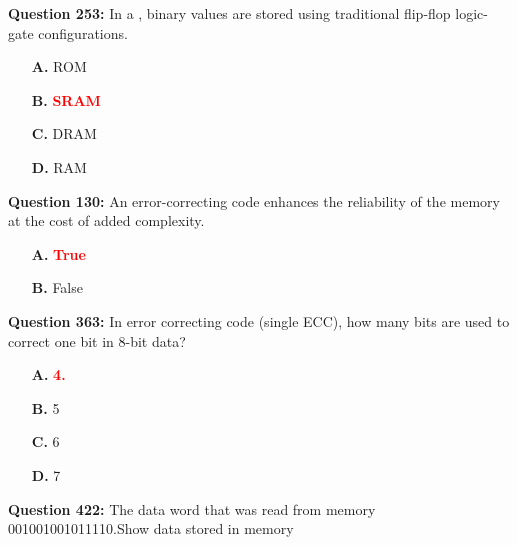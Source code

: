 \documentclass[12pt,a4paper]{article}
\begin{document}
\vspace{0.5cm}

\vspace{0.5cm}

\textbf{Question 253:} In a \underline{\hspace{1.5cm}}, binary values are stored using traditional flip-flop logic-gate configurations.

\begin{itemize}
    \item[\textbf{A.}] ROM
    \item[\textbf{B.}] \textcolor{red}{\textbf{SRAM}}
    \item[\textbf{C.}] DRAM
    \item[\textbf{D.}] RAM
\end{itemize}

\vspace{0.5cm}

\vspace{0.5cm}

\textbf{Question 130:} An error-correcting code enhances the reliability of the memory at the cost of added complexity.

\begin{itemize}
    \item[\textbf{A.}] \textcolor{red}{\textbf{True}}
    \item[\textbf{B.}] False
\end{itemize}

\vspace{0.5cm}

\vspace{0.5cm}

\textbf{Question 363:} In error correcting code (single ECC), how many bits are used to correct one bit in 8-bit data?

\begin{itemize}
    \item[\textbf{A.}] \textcolor{red}{\textbf{4.}}
    \item[\textbf{B.}] 5
    \item[\textbf{C.}] 6
    \item[\textbf{D.}] 7
\end{itemize}

\vspace{0.5cm}

\vspace{0.5cm}

\textbf{Question 422:} The data word that was read from memory 001001001011110.Show data stored in memory
\end{document}
